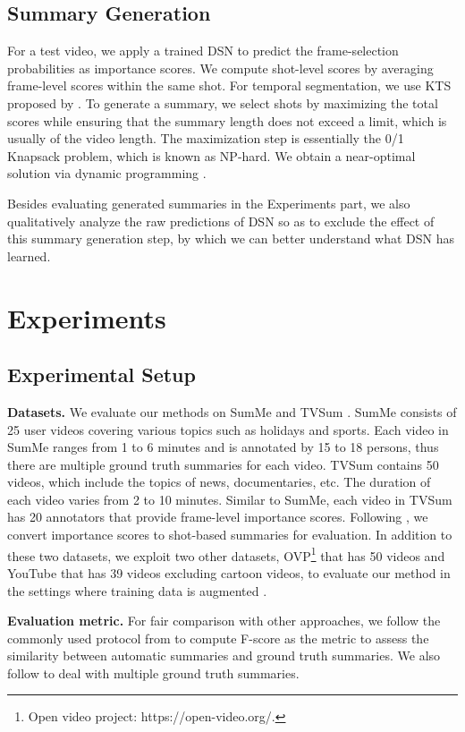 \documentclass[letterpaper]{article} \usepackage{aaai18}  \usepackage{times}  \usepackage{helvet}  \usepackage{courier}  \usepackage{url}  \usepackage{graphicx}
\begin{document}
\subsection{Summary Generation}
For a test video, we apply a trained DSN to predict the frame-selection probabilities as importance scores. We compute shot-level scores by averaging frame-level scores within the same shot. For temporal segmentation, we use KTS proposed by \cite{potapov2014category}. To generate a summary, we select shots by maximizing the total scores while ensuring that the summary length does not exceed a limit, which is usually  of the video length. The maximization step is essentially the 0/1 Knapsack problem, which is known as NP-hard. We obtain a near-optimal solution via dynamic programming \cite{song2015tvsum}.

Besides evaluating generated summaries in the Experiments part, we also qualitatively analyze the raw predictions of DSN so as to exclude the effect of this summary generation step, by which we can better understand what DSN has learned.


\section{Experiments}
\subsection{Experimental Setup}
{\bf Datasets.} We evaluate our methods on SumMe \cite{gygli2014creating} and TVSum \cite{song2015tvsum}. SumMe consists of 25 user videos covering various topics such as holidays and sports. Each video in SumMe ranges from 1 to 6 minutes and is annotated by 15 to 18 persons, thus there are multiple ground truth summaries for each video. TVSum contains 50 videos, which include the topics of news, documentaries, etc. The duration of each video varies from 2 to 10 minutes. Similar to SumMe, each video in TVSum has 20 annotators that provide frame-level importance scores. Following \cite{song2015tvsum,zhang2016video}, we convert importance scores to shot-based summaries for evaluation. In addition to these two datasets, we exploit two other datasets, OVP\footnote{Open video project: https://open-video.org/.} that has 50 videos and YouTube \cite{de2011vsumm} that has 39 videos excluding cartoon videos, to evaluate our method in the settings where training data is augmented \cite{zhang2016video,mahasseniunsupervised}.

{\bf Evaluation metric.} For fair comparison with other approaches, we follow the commonly used protocol from \cite{zhang2016video} to compute F-score as the metric to assess the similarity between automatic summaries and ground truth summaries. We also follow \cite{zhang2016video} to deal with multiple ground truth summaries.
\end{document}
